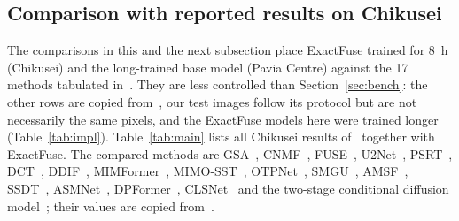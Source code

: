 \documentclass[journal]{IEEEtran}
\begin{document}


\subsection{Comparison with reported results on Chikusei}
The comparisons in this and the next subsection place ExactFuse trained for 8~h (Chikusei) and the long-trained base model (Pavia Centre) against the 17 methods tabulated in~\cite{chen2026twostage}. They are less controlled than Section~\ref{sec:bench}: the other rows are copied from~\cite{chen2026twostage}, our test images follow its protocol but are not necessarily the same pixels, and the ExactFuse models here were trained longer (Table~\ref{tab:impl}). Table~\ref{tab:main} lists all Chikusei results of~\cite{chen2026twostage} together with ExactFuse. The compared methods are GSA~\cite{aiazzi2007gsa}, CNMF~\cite{yokoya2012cnmf}, FUSE~\cite{wei2015fuse}, U2Net~\cite{peng2023u2net}, PSRT~\cite{deng2023psrt}, DCT~\cite{ma2024reciprocal}, DDIF~\cite{cao2024ddif}, MIMFormer~\cite{li2024mimformer}, MIMO-SST~\cite{fang2024mimosst}, OTPNet~\cite{yu2025otpnet}, SMGU~\cite{yan2025smgu}, AMSF~\cite{liu2025amsf}, SSDT~\cite{fu2025ssdt}, ASMNet~\cite{liu2025asmnet}, DPFormer~\cite{liu2026dpformer}, CLSNet~\cite{yang2026clsnet} and the two-stage conditional diffusion model~\cite{chen2026twostage}; their values are copied from~\cite{chen2026twostage}.
\end{document}
